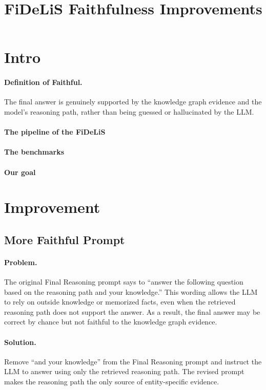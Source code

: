 \documentclass[11pt]{article}
\title{FiDeLiS Faithfulness Improvements}
\author{}
\date{}
\begin{document}
\maketitle

\section{Intro}

\paragraph{Definition of Faithful.}
The final answer is genuinely supported by the knowledge graph evidence and the model's reasoning path, rather than being guessed or hallucinated by the LLM.

\paragraph{The pipeline of the FiDeLiS}

\paragraph{The benchmarks}

\paragraph{Our goal}

\section{Improvement}

\subsection{More Faithful Prompt}

\paragraph{Problem.}
The original Final Reasoning prompt says to ``answer the following question based on the reasoning path and your knowledge.'' This wording allows the LLM to rely on outside knowledge or memorized facts, even when the retrieved reasoning path does not support the answer. As a result, the final answer may be correct by chance but not faithful to the knowledge graph evidence.

\paragraph{Solution.}
Remove ``and your knowledge'' from the Final Reasoning prompt and instruct the LLM to answer using only the retrieved reasoning path. The revised prompt makes the reasoning path the only source of entity-specific evidence.
\end{document}
